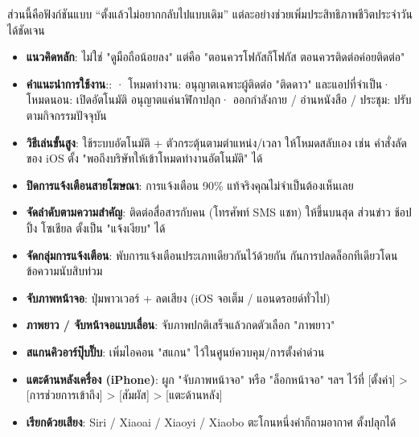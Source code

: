 
ส่วนนี้คือฟังก์ชันแบบ “ตั้งแล้วไม่อยากกลับไปแบบเดิม” แต่ละอย่างช่วยเพิ่มประสิทธิภาพชีวิตประจำวันได้ชัดเจน


\begin{itemize}
  \item \textbf{แนวคิดหลัก}: ไม่ใช่ "ดูมือถือน้อยลง" แต่คือ "ตอนควรโฟกัสก็โฟกัส ตอนควรติดต่อค่อยติดต่อ"
  \item \textbf{คำแนะนำการใช้งาน}:\newline : · โหมดทำงาน: อนุญาตเฉพาะผู้ติดต่อ "ติดดาว" และแอปที่จำเป็น\newline · โหมดนอน: เปิดอัตโนมัติ อนุญาตแค่นาฬิกาปลุก\newline · ออกกำลังกาย / อ่านหนังสือ / ประชุม: ปรับตามกิจกรรมปัจจุบัน
  \item \textbf{วิธีเล่นขั้นสูง}: ใช้ระบบอัตโนมัติ + ตัวกระตุ้นตามตำแหน่ง/เวลา ให้โหมดสลับเอง เช่น คำสั่งลัดของ iOS ตั้ง "พอถึงบริษัทให้เข้าโหมดทำงานอัตโนมัติ" ได้
\end{itemize}


\begin{itemize}
  \item \textbf{ปิดการแจ้งเตือนสายโฆษณา}: การแจ้งเตือน 90\% แท้จริงคุณไม่จำเป็นต้องเห็นเลย
  \item \textbf{จัดลำดับตามความสำคัญ}: ติดต่อสื่อสารกับคน (โทรศัพท์ SMS แชท) ให้ขึ้นบนสุด ส่วนข่าว ช้อปปิ้ง โซเชียล ตั้งเป็น "แจ้งเงียบ" ได้
  \item \textbf{จัดกลุ่มการแจ้งเตือน}: พับการแจ้งเตือนประเภทเดียวกันไว้ด้วยกัน กันการปลดล็อกทีเดียวโดนข้อความนับสิบท่วม
\end{itemize}


\begin{itemize}
  \item \textbf{จับภาพหน้าจอ}: ปุ่มพาวเวอร์ + ลดเสียง (iOS จอเต็ม / แอนดรอยด์ทั่วไป)
  \item \textbf{ภาพยาว / จับหน้าจอแบบเลื่อน}: จับภาพปกติเสร็จแล้วกดตัวเลือก "ภาพยาว"
  \item \textbf{สแกนคิวอาร์ปุ๊บปั๊บ}: เพิ่มไอคอน "สแกน" ไว้ในศูนย์ควบคุม/การตั้งค่าด่วน
  \item \textbf{แตะด้านหลังเครื่อง (iPhone)}: ผูก "จับภาพหน้าจอ" หรือ "ล็อกหน้าจอ" ฯลฯ ไว้ที่ [ตั้งค่า] > [การช่วยการเข้าถึง] > [สัมผัส] > [แตะด้านหลัง]
  \item \textbf{เรียกด้วยเสียง}: Siri / Xiaoai / Xiaoyi / Xiaobo ตะโกนหนึ่งคำก็ถามอากาศ ตั้งปลุกได้
\end{itemize}

